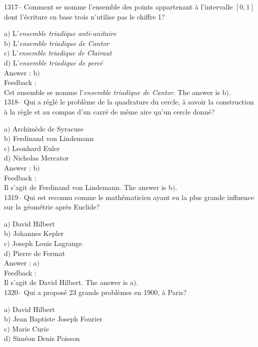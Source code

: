 \documentclass[letterpaper, 12pt]{article}
\begin{document}
1317-- Comment se nomme l'ensemble des points appartenant \`a
l'intervalle $[0,1]$ dont l'\'ecriture en base trois n'utilise pas
le chiffre 1?

a$)$ L'{\sl ensemble triadique anti-unitaire} \\
b$)$ L'{\sl ensemble triadique de Cantor} \\
c$)$ L'{\sl ensemble triadique de Clairaut} \\
d$)$ L'{\sl ensemble triadique de perc\'e}\\

Answer : b$)$\\

Feedback : \\
Cet ensemble se nomme l'{\sl ensemble triadique de Cantor}.
The answer is  b$)$.\\

1318-- Qui a r\'egl\'e le probl\`eme de la quadrature du cercle, \`a
savoir la construction \`a la r\`egle et au compas d'un carr\'e de
m\^eme aire qu'un cercle donn\'e?

a$)$ Archim\`ede de Syracuse \\
b$)$ Ferdinand von Lindemann \\
c$)$ Leonhard Euler \\
d$)$ Nicholas Mercator\\

Answer : b$)$\\

Feedback : \\
Il s'agit de Ferdinand von Lindemann.
The answer is  b$)$.\\

1319-- Qui est reconnu comme le math\'ematicien ayant eu la plus
grande influence sur la g\'eom\'etrie apr\`es Euclide?

a$)$ David Hilbert \\
b$)$ Johannes Kepler \\
c$)$ Joseph Louis Lagrange \\
d$)$ Pierre de Fermat\\

Answer : a$)$\\

Feedback : \\
Il s'agit de David Hilbert.
The answer is  a$)$.\\

1320-- Qui a propos\'e 23 grands probl\`emes en 1900, \`a Paris?

a$)$ David Hilbert \\
b$)$ Jean Baptiste Joseph Fourier \\
c$)$ Marie Curie \\
d$)$ Sim\'eon Denis Poisson\\
\end{document}
